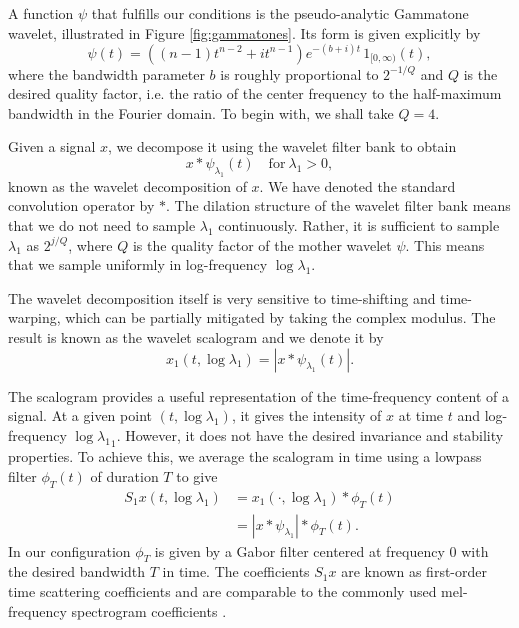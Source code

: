 \documentclass{article}
\newcommand{\lau}{{\lambda_1}}
\begin{document}
\begin{sloppy}
A function $\psi$ that fulfills our conditions is the pseudo-analytic Gammatone wavelet, illustrated in Figure \ref{fig:gammatones}. Its form is given explicitly by
\begin{equation}
	\psi(t) = \left((n-1)t^{n-2}+ i t^{n-1}\right)e^{-(b + i) t}\, 1_{[0,\infty)}(t),
\end{equation}
where the bandwidth parameter $b$ is roughly proportional to $2^{-1/Q}$ and $Q$ is the desired quality factor, i.e. the ratio of the center frequency to the half-maximum bandwidth in the Fourier domain. To begin with, we shall take $Q = 4$.

Given a signal $x$, we decompose it using the wavelet filter bank to obtain
\begin{equation}
	x \ast \psi_\lau(t) \quad \mathrm{for~}\lau>0,
\end{equation}
known as the wavelet decomposition of $x$. We have denoted the standard convolution operator by $\ast$. The dilation structure of the wavelet filter bank means that we do not need to sample $\lau$ continuously. Rather, it is sufficient to sample $\lau$ as $2^{j/Q}$, where $Q$ is the quality factor of the mother wavelet $\psi$. This means that we sample uniformly in log-frequency $\log \lau$.

The wavelet decomposition itself is very sensitive to time-shifting and time-warping, which can be partially mitigated by taking the complex modulus. The result is known as the wavelet scalogram and we denote it by
\begin{equation}
	x_1(t, \log \lau) = | x \ast \psi_\lau(t) |.
\end{equation}

The scalogram provides a useful representation of the time-frequency content of a signal. At a given point $(t, \log \lau)$, it gives the intensity of $x$ at time $t$ and log-frequency $\log \lau_1$. However, it does not have the desired invariance and stability properties. To achieve this, we average the scalogram in time using a lowpass filter $\phi_T(t)$ of duration $T$ to give
\begin{align}
	\nonumber
	S_1 x(t, \log \lau) &= x_1(\cdot, \log \lau) \ast \phi_T(t) \\
	&= | x \ast \psi_\lau | \ast \phi_T(t).
\end{align}
In our configuration $\phi_T$ is given by a Gabor filter centered at frequency $0$ with the desired bandwidth $T$ in time. The coefficients $S_1 x$ are known as first-order time scattering coefficients and are comparable to the commonly used mel-frequency spectrogram coefficients \cite{davis-mermelstein}.


\end{sloppy}
\end{document}

